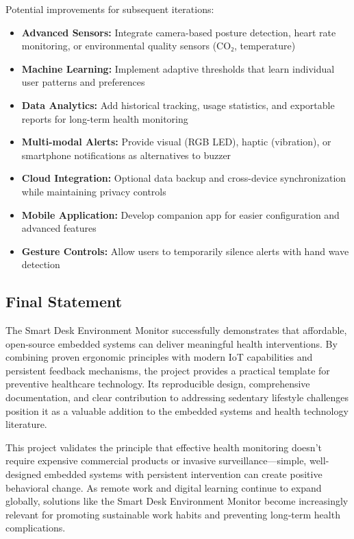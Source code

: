 \documentclass[12pt,a4paper]{article}
\begin{document}
Potential improvements for subsequent iterations:

\begin{itemize}
\item \textbf{Advanced Sensors:} Integrate camera-based posture detection, heart rate monitoring, or environmental quality sensors (CO₂, temperature)

\item \textbf{Machine Learning:} Implement adaptive thresholds that learn individual user patterns and preferences

\item \textbf{Data Analytics:} Add historical tracking, usage statistics, and exportable reports for long-term health monitoring

\item \textbf{Multi-modal Alerts:} Provide visual (RGB LED), haptic (vibration), or smartphone notifications as alternatives to buzzer

\item \textbf{Cloud Integration:} Optional data backup and cross-device synchronization while maintaining privacy controls

\item \textbf{Mobile Application:} Develop companion app for easier configuration and advanced features

\item \textbf{Gesture Controls:} Allow users to temporarily silence alerts with hand wave detection
\end{itemize}

\subsection{Final Statement}

The Smart Desk Environment Monitor successfully demonstrates that affordable, open-source embedded systems can deliver meaningful health interventions. By combining proven ergonomic principles with modern IoT capabilities and persistent feedback mechanisms, the project provides a practical template for preventive healthcare technology. Its reproducible design, comprehensive documentation, and clear contribution to addressing sedentary lifestyle challenges position it as a valuable addition to the embedded systems and health technology literature.

This project validates the principle that effective health monitoring doesn't require expensive commercial products or invasive surveillance—simple, well-designed embedded systems with persistent intervention can create positive behavioral change. As remote work and digital learning continue to expand globally, solutions like the Smart Desk Environment Monitor become increasingly relevant for promoting sustainable work habits and preventing long-term health complications.
\end{document}

